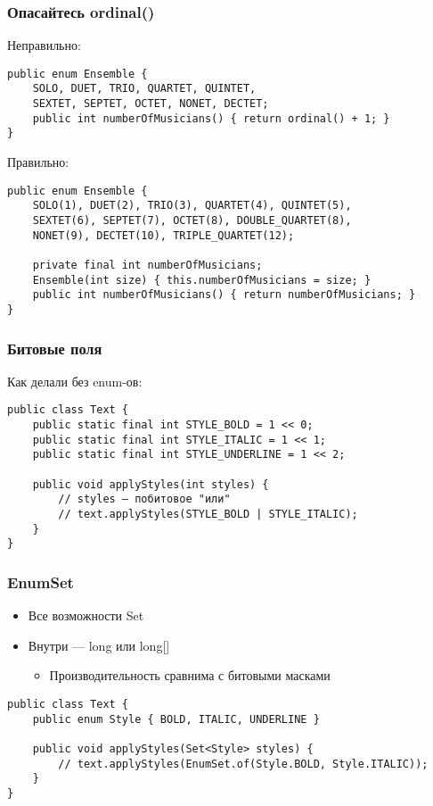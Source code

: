 \documentclass[xetex,mathserif,serif]{beamer}
\begin{document}
	\begin{frame}[fragile]
		\frametitle{Опасайтесь ordinal()}
		\begin{small}
			Неправильно:
			\begin{verbatim}
public enum Ensemble {
    SOLO, DUET, TRIO, QUARTET, QUINTET,
    SEXTET, SEPTET, OCTET, NONET, DECTET;
    public int numberOfMusicians() { return ordinal() + 1; }
}
			\end{verbatim}
			\vspace{3mm}
			Правильно:
			\begin{verbatim}
public enum Ensemble {
    SOLO(1), DUET(2), TRIO(3), QUARTET(4), QUINTET(5),
    SEXTET(6), SEPTET(7), OCTET(8), DOUBLE_QUARTET(8),
    NONET(9), DECTET(10), TRIPLE_QUARTET(12);

    private final int numberOfMusicians;
    Ensemble(int size) { this.numberOfMusicians = size; }
    public int numberOfMusicians() { return numberOfMusicians; }
}
			\end{verbatim}
		\end{small}
	\end{frame}

	\begin{frame}[fragile]
		\frametitle{Битовые поля}
		Как делали без enum-ов:

		\begin{verbatim}
public class Text {
    public static final int STYLE_BOLD = 1 << 0;
    public static final int STYLE_ITALIC = 1 << 1;
    public static final int STYLE_UNDERLINE = 1 << 2;
   
    public void applyStyles(int styles) {
        // styles — побитовое "или"
        // text.applyStyles(STYLE_BOLD | STYLE_ITALIC);
    }
}
		\end{verbatim}
	\end{frame}

	\begin{frame}[fragile]
		\frametitle{EnumSet}
		\begin{itemize}
			\item Все возможности Set
			\item Внутри --- long или long[]
			\begin{itemize}
				\item Производительность сравнима с битовыми масками
			\end{itemize}
		\end{itemize}
		\vspace{4mm}
		\begin{verbatim}
public class Text {
    public enum Style { BOLD, ITALIC, UNDERLINE }
    
    public void applyStyles(Set<Style> styles) {
        // text.applyStyles(EnumSet.of(Style.BOLD, Style.ITALIC));
    }
}
		\end{verbatim}
	\end{frame}
\end{document}
